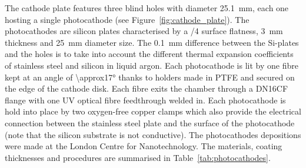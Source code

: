 \documentclass[a4paper,11pt]{article}
\begin{document}
\begin{table}[tb]
\centering
\caption[]{The table summarises the properties of the photocathode coatings tested. Note that the gold photocathode needs a $\approx$\SI{5}{nm} Ti substrate for the gold to adhere. All the depositions have been performed at the London Centre for Nanotechnology.}
    
    \smallskip
    \label{tab:photocathodes}
\end{table}

The cathode plate features three blind holes with diameter \SI{25.1}{mm}, each one hosting a single photocathode (see Figure~\ref{fig:cathode_plate}). 
The photocathodes are silicon plates characterised by a \textlambda/4 surface flatness, \SI{3}{mm} thickness and \SI{25}{mm} diameter size. 
The \SI{0.1}{mm} difference between the Si-plates and the holes is to take into account the different thermal expansion coefficients of stainless steel and silicon in liquid argon. 
Each photocathode is lit by one fibre kept at an angle of \ang{\approx17} thanks to holders made in PTFE and secured on the edge of the cathode disk.  Each fibre exits the chamber through a DN16CF flange with one UV optical fibre feedthrough welded in. 
Each photocathode is hold into place by two oxygen-free copper clamps which also provide the electrical connection between the stainless steel plate and the surface of the photocathode (note that the silicon substrate is not conductive). 
The photocathodes depositions were made at the London Centre for Nanotechnology. The materials, coating thicknesses and procedures are summarised in Table~\ref{tab:photocathodes}.
\end{document}
